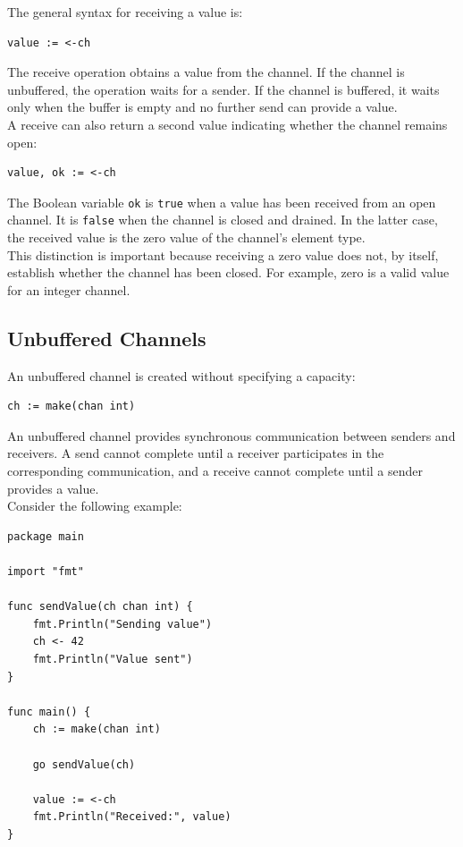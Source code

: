 The general syntax for receiving a value is:

\begin{lstlisting}
value := <-ch
\end{lstlisting}

The receive operation obtains a value from the channel. If the channel is unbuffered, the operation waits for a sender. If the channel is buffered, it waits only when the buffer is empty and no further send can provide a value.\\

A receive can also return a second value indicating whether the channel remains open:

\begin{lstlisting}
value, ok := <-ch
\end{lstlisting}

The Boolean variable \texttt{ok} is \texttt{true} when a value has been received from an open channel. It is \texttt{false} when the channel is closed and drained. In the latter case, the received value is the zero value of the channel's element type.\\

This distinction is important because receiving a zero value does not, by itself, establish whether the channel has been closed. For example, zero is a valid value for an integer channel.

\subsection{Unbuffered Channels}

An unbuffered channel is created without specifying a capacity:

\begin{lstlisting}
ch := make(chan int)
\end{lstlisting}

An unbuffered channel provides synchronous communication between senders and receivers. A send cannot complete until a receiver participates in the corresponding communication, and a receive cannot complete until a sender provides a value.\\

Consider the following example:

\begin{lstlisting}
package main

import "fmt"

func sendValue(ch chan int) {
    fmt.Println("Sending value")
    ch <- 42
    fmt.Println("Value sent")
}

func main() {
    ch := make(chan int)

    go sendValue(ch)

    value := <-ch
    fmt.Println("Received:", value)
}
\end{lstlisting}

